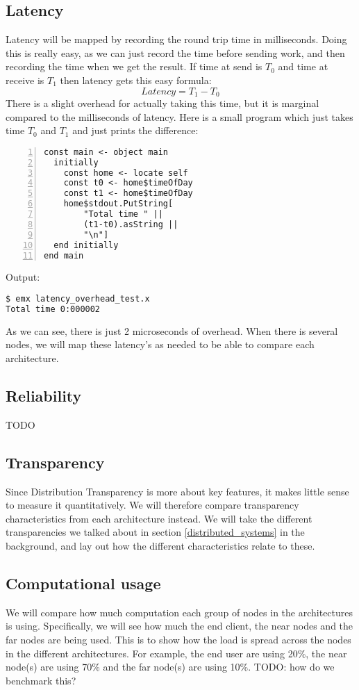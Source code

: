 \subsection{Latency}
Latency will be mapped by recording the round trip time in milliseconds. Doing this is really easy, as we can just record the time before sending work, and then recording the time when we get the result. If time at send is $T_0$ and time at receive is $T_1$ then latency gets this easy formula:
\[Latency=T_1-T_0\]
There is a slight overhead for actually taking this time, but it is marginal compared to the milliseconds of latency. Here is a small program which just takes time $T_0$ and $T_1$ and just prints the difference:
\begin{lstlisting}[language=emerald, numbers=left]
const main <- object main
  initially
    const home <- locate self
    const t0 <- home$timeOfDay
    const t1 <- home$timeOfDay
    home$stdout.PutString[
        "Total time " || 
        (t1-t0).asString ||
        "\n"]
  end initially
end main
\end{lstlisting}
Output:
\begin{lstlisting}[language=Bash]
$ emx latency_overhead_test.x
Total time 0:000002
\end{lstlisting}
As we can see, there is just 2 microseconds of overhead.
When there is several nodes, we will map these latency's as needed to be able to compare each architecture.

\subsection{Reliability}
TODO

\subsection{Transparency}
Since Distribution Transparency is more about key features, it makes little sense to measure it quantitatively. We will therefore compare transparency characteristics from each architecture instead. We will take the different transparencies we talked about in section \ref{distributed_systems} in the background, and lay out how the different characteristics relate to these.


\subsection{Computational usage}
We will compare how much computation each group of nodes in the architectures is using. Specifically, we will see how much the end client, the near nodes and the far nodes are being used. This is to show how the load is spread across the nodes in the different architectures. For example, the end user are using 20\%, the near node(s) are using 70\% and the far node(s) are using 10\%.
TODO: how do we benchmark this?

